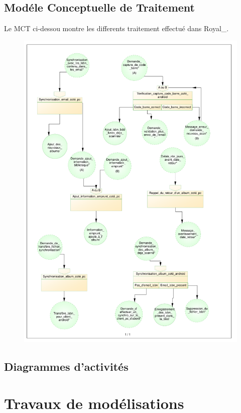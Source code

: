 \subsection{Modéle Conceptuelle de Traitement}

Le MCT ci-dessou montre les differents traitement effectué dans Royal\_. 

\begin{figure}
\includegraphics[width=16cm]{MCT_Royal.pdf}
\end{figure}
\clearpage{}

\subsection{Diagrammes d'activités}

\section{Travaux de modélisations}

